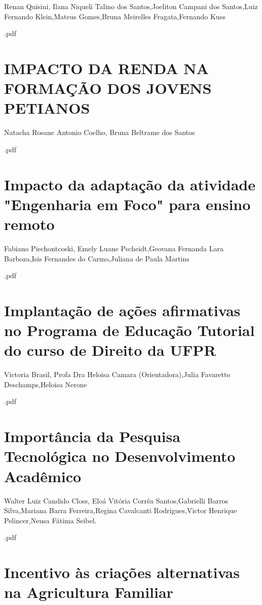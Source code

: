 Renan Quisini, Ilana Niqueli Talino dos Santos,Joeliton Campani dos Santos,Luiz Fernando Klein,Mateus Gomes,Bruna Meirelles Fragata,Fernando Kuss



.pdf\section{IMPACTO DA RENDA NA FORMAÇÃO DOS JOVENS PETIANOS}

Natacha Rosane Antonio Coelho, Bruna Beltrame dos Santos



.pdf\section{Impacto da adaptação da atividade "Engenharia em Foco" para ensino remoto}

Fabiano Piechontcoski, Emely Luane Pscheidt,Geovana Fernanda Lara Barboza,Isis Fernandes do Carmo,Juliana de Paula Martins



.pdf\section{Implantação de ações afirmativas no Programa de Educação Tutorial do curso de Direito da UFPR}

Victoria Brasil, Profa Dra Heloisa Camara (Orientadora),Julia Favaretto Deschamps,Heloisa Nerone



.pdf\section{Importância da Pesquisa Tecnológica no Desenvolvimento Acadêmico}

Walter Luiz Candido Closs, Eloá Vitória Corrêa Santos,Gabrielli Barros Silva,Mariana Barra Ferreira,Regina Cavalcanti Rodrigues,Victor Henrique Pelincer,Neusa Fátima Seibel.



.pdf\section{Incentivo às criações alternativas na Agricultura Familiar}

